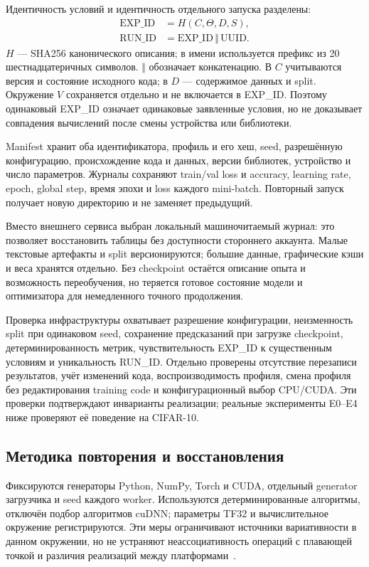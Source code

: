 Идентичность условий и идентичность отдельного запуска разделены:
\begin{equation}
\begin{aligned}
\mathrm{EXP\_ID}&=H(C,\Theta,D,S),\\
\mathrm{RUN\_ID}&=\mathrm{EXP\_ID}\,\Vert\,\mathrm{UUID}.
\end{aligned}\label{eq:ids}
\end{equation}
$H$ --- SHA256 канонического описания; в имени используется префикс из 20 шестнадцатеричных символов. $\Vert$ обозначает конкатенацию. В $C$ учитываются версия и состояние исходного кода; в $D$ --- содержимое данных и split. Окружение $V$ сохраняется отдельно и не включается в EXP\_ID. Поэтому одинаковый EXP\_ID означает одинаковые заявленные условия, но не доказывает совпадения вычислений после смены устройства или библиотеки.

Manifest хранит оба идентификатора, профиль и его хеш, seed, разрешённую конфигурацию, происхождение кода и данных, версии библиотек, устройство и число параметров. Журналы сохраняют train/val loss и accuracy, learning rate, epoch, global step, время эпохи и loss каждого mini-batch. Повторный запуск получает новую директорию и не заменяет предыдущий.

Вместо внешнего сервиса выбран локальный машиночитаемый журнал: это позволяет восстановить таблицы без доступности стороннего аккаунта. Малые текстовые артефакты и split версионируются; большие данные, графические кэши и веса хранятся отдельно. Без checkpoint остаётся описание опыта и возможность переобучения, но теряется готовое состояние модели и оптимизатора для немедленного точного продолжения.

Проверка инфраструктуры охватывает разрешение конфигурации, неизменность split при одинаковом seed, сохранение предсказаний при загрузке checkpoint, детерминированность метрик, чувствительность EXP\_ID к существенным условиям и уникальность RUN\_ID. Отдельно проверены отсутствие перезаписи результатов, учёт изменений кода, воспроизводимость профиля, смена профиля без редактирования training code и конфигурационный выбор CPU/CUDA. Эти проверки подтверждают инварианты реализации; реальные эксперименты E0--E4 ниже проверяют её поведение на CIFAR-10.

\subsection{Методика повторения и восстановления}
Фиксируются генераторы Python, NumPy, Torch и CUDA, отдельный generator загрузчика и seed каждого worker. Используются детерминированные алгоритмы, отключён подбор алгоритмов cuDNN; параметры TF32 и вычислительное окружение регистрируются. Эти меры ограничивают источники вариативности в данном окружении, но не устраняют неассоциативность операций с плавающей точкой и различия реализаций между платформами~\cite{torch}.

